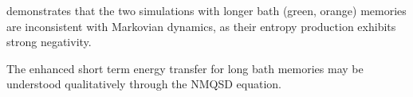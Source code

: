  demonstrates that the two simulations with
longer bath (green, orange) memories are inconsistent with Markovian
dynamics, as their entropy production exhibits strong negativity.

The enhanced short term energy transfer for long bath memories may be
understood qualitatively through the NMQSD equation.%


